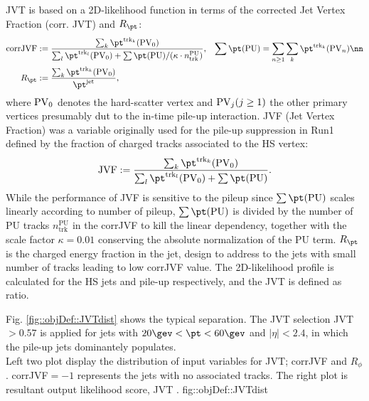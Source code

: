 JVT is based on a 2D-likelihood function in terms of the corrected Jet Vertex Fraction (corr. JVT) and $R_{\pt}$:
\begin{align}
\mathrm{corrJVF} & := \frac{ \sum_k \pttk (\pv_0)  }{\sum_l \pttl (\pv_0) + \sum\pt(\mathrm{PU})/ (\kappa \cdot n_{\mathrm{trk}}^{\mathrm{PU}} )  }
,  \,\,\,\,\,  \sum\pt(\mathrm{PU}) = \sum_{n \ge 1} \sum_k  \pttk (\pv_n)  \nn \\
R_{\pt} & := \frac{\sum_k \pttk (\pv_0) }{\pt^{\mathrm{jet}}},
\end{align}
where $\mathrm{PV}_0$ denotes the hard-scatter vertex and  $\mathrm{PV}_j (j \ge 1)$ the other primary vertices presumably dut to the in-time pile-up interaction. 
JVF (Jet Vertex Fraction) was a variable originally used for the pile-up suppression in Run1 \cite{JVF} defined by the fraction of charged tracks associated to the HS vertex:
\begin{align}
\mathrm{JVF} := \frac{ \sum_k \pttk (\pv_0)  }{ \sum_l \pttl (\pv_0) + \sum\pt(\mathrm{PU}) }.
\end{align}
While the performance of JVF is sensitive to the pileup since $\sum\pt(\mathrm{PU})$ scales linearly according to number of pileup, $\sum\pt(\mathrm{PU})$ is divided by the number of PU tracks $n_{\mathrm{trk}}^{\mathrm{PU}}$ in the corrJVF to kill the linear dependency, together with the scale factor $\kappa=0.01$ conserving the absolute normalization of the PU term.
$R_{\pt}$ is the charged energy fraction in the jet, design to address to the jets with small number of tracks leading to low corrJVF value.
The 2D-likelihood profile is calculated for the HS jets and pile-up respectively, and the JVT is defined as ratio.

Fig. \ref{fig::objDef::JVTdist} shows the typical separation.
The JVT selection JVT$>0.57$ is applied for jets with $20 \gev < \pt< 60\gev$ and $|\eta|<2.4$, in which the pile-up jets dominantely populates.  \\


%

{Left two plot display the distribution of input variables for JVT; corrJVF and $R_\phi$. corrJVF$=-1$ represents the jets with no associated tracks. The right plot is resultant output likelihood score,  JVT  \cite{155_JVT}.
}
{fig::objDef::JVTdist}

